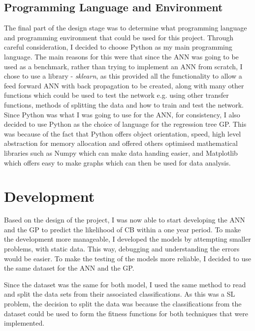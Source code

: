 \documentclass[11pt]{article}
\begin{document}
\subsection{Programming Language and Environment}
The final part of the design stage was to determine what programming language and programming environment that could be used for this project. Through careful consideration, I decided to choose Python as my main programming language. The main reasons for this were that since the ANN was going to be used as a benchmark, rather than trying to implement an ANN from scratch, I chose to use a library - \textit{sklearn}, as this provided all the functionality to allow a feed forward ANN with back propagation to be created, along with many other functions which could be used to test the network e.g. using other transfer functions, methods of splitting the data and how to train and test the network. Since Python was what I was going to use for the ANN, for consistency, I also decided to use Python as the choice of language for the regression tree GP. This was because of the fact that Python offers object orientation, speed, high level abstraction for memory allocation and offered others optimised mathematical libraries such as Numpy which can make data handing easier, and Matplotlib which offers easy to make graphs which can then be used for data analysis. 
\section{Development}
Based on the design of the project, I was now able to start developing the ANN and the GP to predict the likelihood of CB within a one year period. To make the development more manageable, I developed the models by attempting smaller problems, with static data. This way, debugging and understanding the errors would be easier. To make the testing of the models more reliable, I decided to use the same dataset for the ANN and the GP. 

Since the dataset was the same for both model, I used the same method to read and split the data sets from their associated classifications. As this was a SL problem, the decision to split the data was because the classifications from the dataset could be used to form the fitness functions for both techniques that were implemented.
\end{document}
